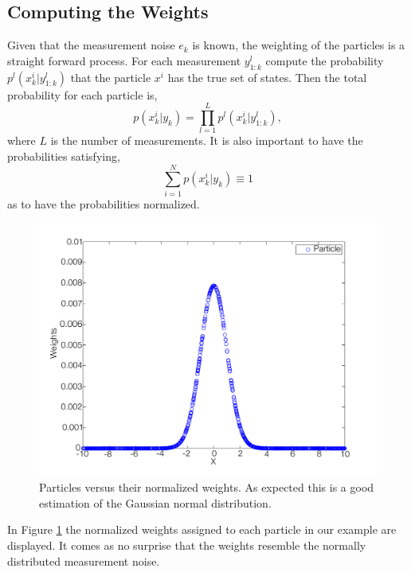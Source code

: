 \documentclass{LTHthesis}
\begin{document}
\subsection{Computing the Weights}
%
Given that the measurement noise $e_k$ is known, the weighting of the particles is a straight forward process. For each measurement $y^l_{1:k}$ compute the probability $p^l(x^i_k|y^l_{1:k})$ that the particle $x^i$ has the true set of states. Then the total probability for each particle is,
%
\begin{equation}
p(x^i_k|y_k)=\prod_{l=1}^{L}p^l(x^i_k|y^l_{1:k}), 
\end{equation}
%
where $L$ is the number of measurements. It is also important to have the probabilities satisfying,
%
\begin{equation}
\sum^{N}_{i=1}p(x^i_k|y_k)\equiv 1
\end{equation}
%
as to have the probabilities normalized.
%
\begin{figure}[!hbt]

\includegraphics[width=1\textwidth ]{images/PF/particle_weights}
\caption{Particles versus their normalized weights. As expected this is a good estimation of the Gaussian normal distribution.}\label{particle_weights}
\end{figure}

In Figure \ref{particle_weights} the normalized weights assigned to each particle in our example are displayed. It comes as no surprise that the weights resemble the normally distributed measurement noise. 
%
\end{document}
